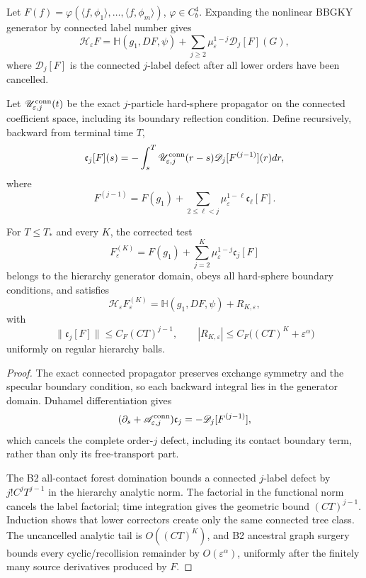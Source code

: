 Let \(F(f)=\varphi(\langle f,\phi_1\rangle,\ldots,
\langle f,\phi_m\rangle)\), \(\varphi\in C_b^4\).  Expanding the nonlinear
BBGKY generator by connected label number gives
\[
 \mathscr H_\varepsilon F
 =\mathbb H(g_1,DF,\psi)+
 \sum_{j\ge2}\mu_\varepsilon^{1-j}\mathscr D_j[F](G),
\]
where \(\mathscr D_j[F]\) is the connected \(j\)-label defect after all lower
orders have been cancelled.

Let \(\mathscr U_{\varepsilon,j}^{\rm conn}(t)\) be the exact
\(j\)-particle hard-sphere propagator on the connected coefficient space,
including its boundary reflection condition.  Define recursively, backward
from terminal time \(T\),
\[
 \mathfrak c_j[F](s)
 =-\int_s^T
 \mathscr U_{\varepsilon,j}^{\rm conn}(r-s)
 \mathscr D_j[F^{(j-1)}](r)dr,
\]
where
\[
 F^{(j-1)}=F(g_1)+
 \sum_{2\le\ell<j}\mu_\varepsilon^{1-\ell}
 \mathfrak c_\ell[F].
\]

\begin{lemma}
\label{lem:r3-b4-corrector}
For \(T\le T_*\) and every \(K\), the corrected test
\[
 F_\varepsilon^{(K)}
 =F(g_1)+\sum_{j=2}^K\mu_\varepsilon^{1-j}
 \mathfrak c_j[F]
\]
belongs to the hierarchy generator domain, obeys all hard-sphere boundary
conditions, and satisfies
\[
 \mathscr H_\varepsilon F_\varepsilon^{(K)}
 =\mathbb H(g_1,DF,\psi)+R_{K,\varepsilon},
\]
with
\[
 \|\mathfrak c_j[F]\|\le C_F(CT)^{j-1},
 \qquad
 |R_{K,\varepsilon}|
 \le C_F\big((CT)^K+\varepsilon^\alpha\big)
\]
uniformly on regular hierarchy balls.
\end{lemma}

\begin{proof}
The exact connected propagator preserves exchange symmetry and the specular
boundary condition, so each backward integral lies in the generator domain.
Duhamel differentiation gives
\[
 (\partial_s+\mathscr A_{\varepsilon,j}^{\rm conn})
 \mathfrak c_j=-\mathscr D_j[F^{(j-1)}],
\]
which cancels the complete order-\(j\) defect, including its contact boundary
term, rather than only its free-transport part.

The B2 all-contact forest domination bounds a connected \(j\)-label defect by
\(j!C^jT^{j-1}\) in the hierarchy analytic norm.  The factorial in the
functional norm cancels the label factorial; time integration gives the
geometric bound \((CT)^{j-1}\).  Induction shows that lower correctors create
only the same connected tree class.  The uncancelled analytic tail is
\(O((CT)^K)\), and B2 ancestral graph surgery bounds every cyclic/recollision
remainder by \(O(\varepsilon^\alpha)\), uniformly after the finitely many
source derivatives produced by \(F\).
\end{proof}

